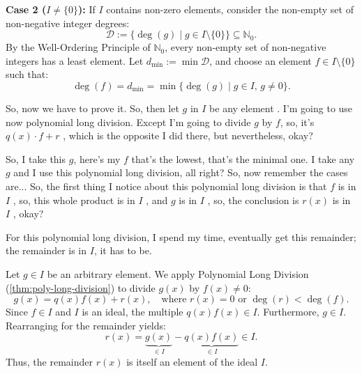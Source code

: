 \begin{proofWrapper}
\begin{content}
\textbf{Case 2 ($I \neq \{0\}$):}
If $I$ contains non-zero elements, consider the non-empty set of non-negative integer degrees:
\[
\mathcal{D} := \{ \deg(g) \mid g \in I \setminus \{0\} \} \subseteq \mathbb{N}_0.
\]
By the Well-Ordering Principle of $\mathbb{N}_0$, every non-empty set of non-negative integers has a least element. Let $d_{\min} := \min \mathcal{D}$, and choose an element $f \in I \setminus \{0\}$ such that:
\begin{equation}\label{eq:minimal-degree-f}
\deg(f) = d_{\min} = \min \{ \deg(g) \mid g \in I, \, g \neq 0 \}.
\end{equation}
\end{content}

\begin{speech}[00:35:48 - 00:37:19]
So, now we have to prove it. So, then let $g$ in $I$ be any element . I'm going to use now polynomial long division. Except I'm going to divide $g$ by $f$, so, it's $q(x) \cdot f + r$ , which is the opposite I did there, but nevertheless, okay?

So, I take this $g$, here's my $f$ that's the lowest, that's the minimal one. I take any $g$ and I use this polynomial long division, all right? So, now remember the cases are... So, the first thing I notice about this polynomial long division is that $f$ is in $I$ , so, this whole product is in $I$ , and $g$ is in $I$ , so, the conclusion is $r(x)$ is in $I$ , okay?

For this polynomial long division, I spend my time, eventually get this remainder; the remainder is in $I$, it has to be.
\end{speech}

\begin{content}
Let $g \in I$ be an arbitrary element. We apply Polynomial Long Division (\cref{thm:poly-long-division}) to divide $g(x)$ by $f(x) \neq 0$:
\begin{equation}\label{eq:div-g-by-f}
g(x) = q(x) f(x) + r(x), \quad \text{where } r(x) = 0 \text{ or } \deg(r) < \deg(f).
\end{equation}
Since $f \in I$ and $I$ is an ideal, the multiple $q(x) f(x) \in I$. Furthermore, $g \in I$.
Rearranging for the remainder yields:
\begin{equation}\label{eq:remainder-in-ideal}
r(x) = \underbrace{g(x)}_{\in I} - \underbrace{q(x) f(x)}_{\in I} \in I.
\end{equation}
Thus, the remainder $r(x)$ is itself an element of the ideal $I$.
\end{content}


\end{proofWrapper}
